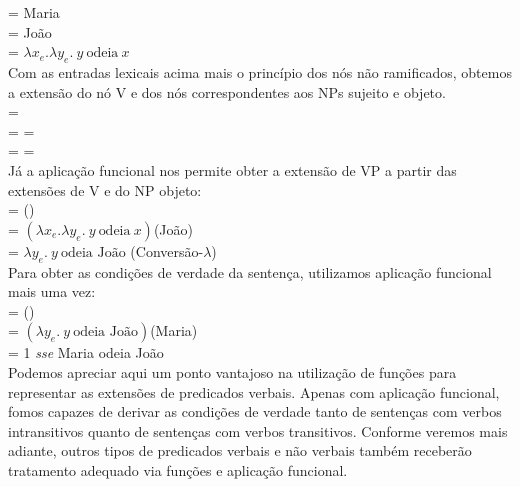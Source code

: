 \n {} = Maria\\

\n {} = João\\

\n {} = $\lambda x_{e}.\lambda y_{e}.\ y\ \text{odeia}\ x$\\

\n Com as entradas lexicais acima mais o princípio dos nós não
ramificados, obtemos a extensão do nó V e dos nós correspondentes
aos NPs sujeito e objeto.\\

\n {} = \\

\n {} =  =
\\

\n {} =  =
\\

\n Já a aplicação funcional nos permite obter a extensão de VP a
partir das extensões de V e do NP objeto:\\

\n {} = ()\\

\n {} = $(\lambda x_{e}.\lambda y_{e}.\ y\ \text{odeia}\ x)$(João)\\

\n {} = $\lambda y_{e}.\ y\ \text{odeia João}$ \hfill (Conversão-$\lambda$)\\

\n Para obter as condições de verdade da sentença, utilizamos
aplicação funcional mais uma vez:\\

\n {} = (\den{[$_{\text{NP}}$ Maria})\\

\n {} = $(\lambda y_{e}.\ y\ \text{odeia João})$(Maria)\\

\n {} = 1 \textit{sse} Maria odeia João \\

\n Podemos apreciar aqui um ponto vantajoso na utilização de funções para representar as extensões de predicados verbais. Apenas com aplicação funcional, fomos capazes de derivar as condições de verdade tanto de sentenças com verbos intransitivos quanto de sentenças com verbos transitivos. Conforme veremos mais adiante, outros tipos de predicados verbais e não verbais também receberão tratamento adequado via funções e aplicação funcional.

